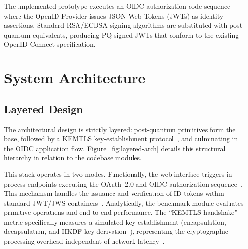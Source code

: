 \documentclass[conference]{IEEEtran}
\begin{document}
                The implemented prototype executes an OIDC authorization-code sequence where the OpenID Provider issues JSON Web Tokens (JWTs) as identity assertions. Standard RSA/ECDSA signing algorithms are substituted with post-quantum equivalents, producing PQ-signed JWTs that conform to the existing OpenID Connect specification.

                \section{System Architecture}
                \subsection{Layered Design}
                The architectural design is strictly layered: post-quantum primitives form the base, followed by a KEMTLS key-establishment protocol~\cite{kemtls}, and culminating in the OIDC application flow. Figure~\ref{fig:layered-arch} details this structural hierarchy in relation to the codebase modules.
                
                This stack operates in two modes. Functionally, the web interface triggers in-process endpoints executing the OAuth~2.0 and OIDC authorization sequence~\cite{rfc6749,oidc-core}. This mechanism handles the issuance and verification of ID tokens within standard JWT/JWS containers~\cite{rfc7519,rfc7515}. Analytically, the benchmark module evaluates primitive operations and end-to-end performance. The ``KEMTLS handshake'' metric specifically measures a simulated key establishment (encapsulation, decapsulation, and HKDF key derivation~\cite{rfc5869}), representing the cryptographic processing overhead independent of network latency~\cite{rfc8446}.
                
\end{document}
